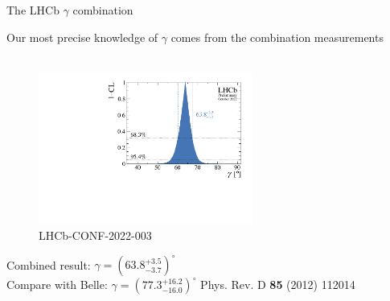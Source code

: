 \documentclass[dvipsnames]{beamer}
\begin{document}
\begin{frame}{The LHCb $\gamma$ combination}
  \begin{center}
    {\Large Our most precise knowledge of $\gamma$ comes from the combination measurements}\\~\\
  \end{center}
  \vspace{-0.5cm}
  \begin{figure}
    \includegraphics[height=5.0cm]{Plots/gammacharm_lhcb_gamma_only.pdf}
    \vspace{-0.5cm}
    \caption*{\tiny LHCb-CONF-2022-003}
  \end{figure}
  \vspace{-0.62cm}
  \begin{center}
    Combined result: \colorbox{Cerulean!30}{$\gamma = (63.8^{+3.5}_{-3.7})^\circ$}\\
    Compare with Belle: $\gamma = (77.3^{+16.2}_{-16.0})^\circ$ Phys. Rev. D \textbf{85} (2012) 112014
  \end{center}
  \vspace{-0.15cm}
\end{frame}
\end{document}
